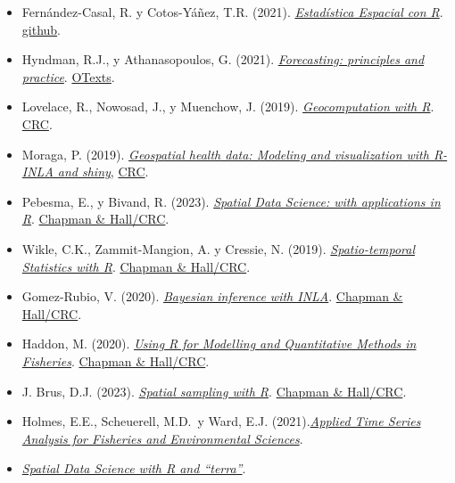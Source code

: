 \documentclass[
]{book}
\theoremstyle{break}
\theoremstyle{nonumberplain}
\begin{document}
\begin{itemize}
\item
  Fernández-Casal, R. y Cotos-Yáñez, T.R. (2021). \emph{\href{https://rubenfcasal.github.io/estadistica_espacial}{Estadística Espacial con R}}. \href{https://github.com/rubenfcasal/estadistica_espacial}{github}.
\item
  Hyndman, R.J., y Athanasopoulos, G. (2021). \emph{\href{https://otexts.com/fpp3}{Forecasting: principles and practice}}. \href{https://www.amazon.es/dp/0987507133}{OTexts}.
\item
  Lovelace, R., Nowosad, J., y Muenchow, J. (2019). \emph{\href{https://geocompr.robinlovelace.net}{Geocomputation with R}}. \href{https://www.routledge.com/9781138304512}{CRC}.
\item
  Moraga, P. (2019). \emph{\href{https://www.paulamoraga.com/book-geospatial}{Geospatial health data: Modeling and visualization with R-INLA and shiny}}, \href{https://www.routledge.com/9780367357955}{CRC}.
\item
  Pebesma, E., y Bivand, R. (2023). \emph{\href{https://keen-swartz-3146c4.netlify.app}{Spatial Data Science: with applications in R}}. \href{https://www.routledge.com/p/book/9781138311183}{Chapman \& Hall/CRC}.
\item
  Wikle, C.K., Zammit-Mangion, A. y Cressie, N. (2019). \emph{\href{https://spacetimewithr.org}{Spatio-temporal Statistics with R}}. \href{}{Chapman \& Hall/CRC}.
\item
  Gomez-Rubio, V. (2020). \emph{\href{https://becarioprecario.bitbucket.io/inla-gitbook/}{Bayesian inference with INLA}}. \href{https://www.routledge.com/p/book/9781138039872}{Chapman \& Hall/CRC}.
\item
  Haddon, M. (2020). \emph{\href{https://haddonm.github.io/URMQMF/}{Using R for Modelling and Quantitative Methods in Fisheries}}. \href{https://www.routledge.com/p/book/9780367469887}{Chapman \& Hall/CRC}.
\item
  J. Brus, D.J. (2023). \emph{\href{https://dickbrus.github.io/SpatialSamplingwithR/}{Spatial sampling with R}}. \href{https://www.routledge.com/p/book/9781032193854}{Chapman \& Hall/CRC}.
\end{itemize}

\begin{itemize}
\item
  Holmes, E.E., Scheuerell, M.D.~y Ward, E.J. (2021).\emph{\href{https://atsa-es.github.io/atsa-labs/}{Applied Time Series Analysis for Fisheries and Environmental Sciences}}.
\item
  \emph{\href{https://rspatial.org/}{Spatial Data Science with R and ``terra''}}.
\end{itemize}
\end{document}
